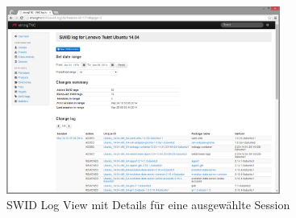 \begin{figure}[H]
	\centering
	\includegraphics[width=0.8\textwidth]{./images/Views/log-view}
	\caption{SWID Log View mit Details für eine ausgewählte Session}
	\label{fig:log-view}
\end{figure}